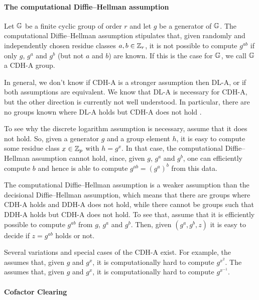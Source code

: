 \paragraph{The computational  Diffie--Hellman assumption}
Let $\mathbb{G}$ be a finite cyclic group of order $r$ and let $g$ be a generator of $\mathbb{G}$. The computational Diffie--Hellman assumption stipulates that, given randomly and independently  chosen residue classes $a,b\in\mathbb{Z}_r$, it is not possible to compute $g^{ab}$ if only $g$, $g^a$ and $g^b$ (but not $a$ and $b$) are known. If this is the case for $\mathbb{G}$, we call $\mathbb{G}$ a CDH-A group.

In general, we don't know if CDH-A is a stronger assumption then DL-A, or if both assumptions are equivalent. We know that DL-A is necessary for CDH-A, but the other direction is currently not well understood. In particular, there are no groups known where DL-A holds but CDH-A does not hold \citep{Fifield12theequivalence}.%

To see why the discrete logarithm assumption is necessary, assume that it does not hold. So, given a generator $g$ and a group element $h$, it is easy to compute some residue class $x\in\mathbb{Z}_p$ with $h=g^x$. In that case, the computational Diffie--Hellman assumption cannot hold, since, given $g$, $g^a$ and $g^b$, one can efficiently compute $b$ and hence is able to compute $g^{ab}=(g^a)^b$ from this data.

The computational Diffie--Hellman assumption is a weaker assumption than the decisional  Diffie--Hellman assumption, which means that there are groups where CDH-A holds and DDH-A does not hold, while there cannot be groups such that DDH-A holds but CDH-A does not hold. To see that, assume that it is efficiently possible to compute $g^{ab}$ from $g$, $g^a$ and $g^b$. Then, given $(g^a,g^b,z)$ it is easy to decide if $z=g^{ab}$ holds or not.

Several variations and special cases of the CDH-A exist. For example, the  assumes that, given $g$ and $g^x$, it is computationally hard to compute $g^{x^2}$. The  assumes that, given $g$ and $g^x$, it is computationally hard to compute $g^{x^{-1}}$. 

\paragraph{Cofactor Clearing}
